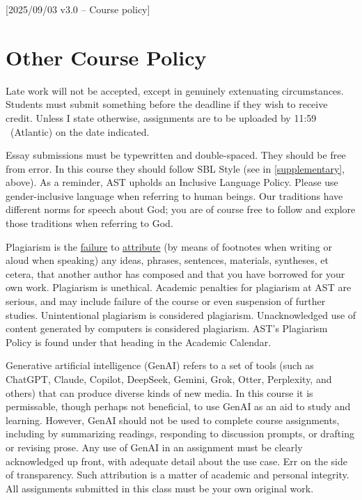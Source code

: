 [2025/09/03 v3.0 -- Course policy]

\section{Other Course Policy}
\label{policy}

Late work will not be accepted, except in genuinely extenuating
circumstances. Students must submit something before the deadline if
they wish to receive credit. Unless I state otherwise, assignments are
to be uploaded by 11:59 \PM\ (Atlantic) on the date indicated.

Essay submissions must be typewritten and double-spaced. They should be
free from error. In this course they should follow SBL Style (see
\cite{sbl2} in \autoref{supplementary}, above). As a reminder, AST
upholds an Inclusive Language Policy. Please use gender-inclusive
language when referring to human beings. Our traditions have different
norms for speech about God; you are of course free to follow and explore
those traditions when referring to God.


Plagiarism is the
\href{http://www.eerdmans.com/Pages/Item/59043/Commentary-Statement.aspx}{failure}
to \href{https://www.theguardian.com/world/2013/feb/09/german-education-minister-quits-phd-plagiarism}{attribute}
(by means of footnotes when writing or aloud when speaking) any ideas,
phrases, sentences, materials, syntheses, et cetera, that another author
has composed and that you have borrowed for your own work. Plagiarism is
unethical. Academic penalties for plagiarism at AST are serious, and may
include failure of the course or even suspension of further studies.
Unintentional plagiarism is considered plagiarism. Unacknowledged use of
content generated by computers is considered plagiarism. AST's
Plagiarism Policy is found under that heading in the Academic Calendar.

Generative artificial intelligence (GenAI) refers to a set of tools
(such as ChatGPT, Claude, Copilot, DeepSeek, Gemini, Grok, Otter,
Perplexity, and others) that can produce diverse kinds of new media. In
this course it is permissable, though perhaps not beneficial, to use
GenAI as an aid to study and learning. However, GenAI should not be used
to complete course assignments, including by summarizing readings,
responding to discussion prompts, or drafting or revising prose. Any use
of GenAI in an assignment must be clearly acknowledged up front, with
adequate detail about the use case. Err on the side of transparency.
Such attribution is a matter of academic and personal integrity. All
assignments submitted in this class must be your own original work.

